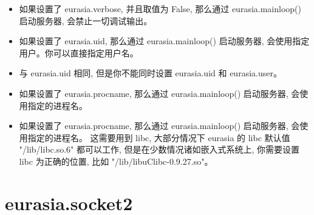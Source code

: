 \documentclass{manual}
\begin{document}
\begin{itemize}
\item {}

如果设置了 eurasia.verbose, 并且取值为 False,
那么通过 eurasia.mainloop() 启动服务器, 会禁止一切调试输出。


\item {}

如果设置了 eurasia.uid, 那么通过 eurasia.mainloop() 启动服务器,
会使用指定用户。你可以直接指定用户名。



\item {}

与 eurasia.uid 相同, 但是你不能同时设置 eurasia.uid 和 eurasia.user。

\item {}

如果设置了 eurasia.procname, 那么通过  eurasia.mainloop() 启动服务器,
会使用指定的进程名。


\item {}

如果设置了 eurasia.procname, 那么通过  eurasia.mainloop() 启动服务器, 会使用指定的进程名。
这需要用到 libc, 大部分情况下 eurasia 的 libc 默认值 "/lib/libc.so.6" 都可以工作,
但是在少数情况诸如嵌入式系统上, 你需要设置 libc 为正确的位置, 比如 "/lib/libuClibc-0.9.27.so"。



\end{itemize}

\section{eurasia.socket2}
\end{document}
